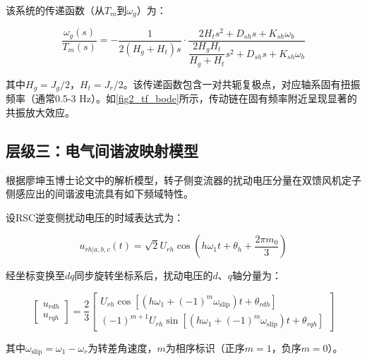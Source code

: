 \documentclass[withoutpreface,bwprint]{cumcmthesis}
\begin{document}
该系统的传递函数（从$T_m$到$\omega_g$）为\cite{xia2024modeling}：

\begin{equation}
\frac{\omega_g(s)}{T_m(s)} = -\frac{1}{2(H_g+H_t)s}\cdot\frac{2H_t s^2 + D_{sh}s + K_{sh}\omega_b}{\dfrac{2H_gH_t}{H_g+H_t}s^2 + D_{sh}s + K_{sh}\omega_b}
\label{eq:tf_drivetrain}
\end{equation}

其中$H_g=J_g/2$，$H_t=J_r/2$。该传递函数包含一对共轭复极点，对应轴系固有扭振频率（通常0.5-3 Hz）。如\cref{fig2_tf_bode}所示，传动链在固有频率附近呈现显著的共振放大效应。


\subsection{层级三：电气间谐波映射模型}

根据廖坤玉博士论文中的解析模型\cite{liao2019doctor}，转子侧变流器的扰动电压分量在双馈风机定子侧感应出的间谐波电流具有如下频域特性。

设RSC逆变侧扰动电压的时域表达式为：

\begin{equation}
u_{rh|a,b,c}(t) = \sqrt{2}U_{rh}\cos\left(h\omega_1 t + \theta_h + \frac{2\pi m_0}{3}\right)
\label{eq:rsc_voltage}
\end{equation}

经坐标变换至$dq$同步旋转坐标系后，扰动电压的$d$、$q$轴分量为：

\begin{equation}
\left[\begin{array}{c} u_{rdh} \\ u_{rqh} \end{array}\right] = 
\frac{2}{3}\left[\begin{array}{c}
U_{rh}\cos[(h\omega_1 + (-1)^m\omega_{\mathrm{slip}})t + \theta_{rdh}] \\
(-1)^{m+1}U_{rh}\sin[(h\omega_1 + (-1)^m\omega_{\mathrm{slip}})t + \theta_{rqh}]
\end{array}\right]
\label{eq:dq_transform}
\end{equation}

其中$\omega_{\mathrm{slip}}=\omega_1-\omega_r$为转差角速度，$m$为相序标识（正序$m=1$，负序$m=0$）。
\end{document}
